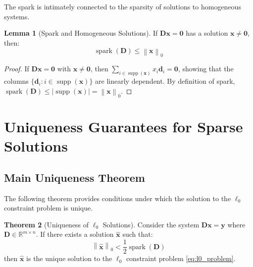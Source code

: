 \documentclass[12pt]{article}
\renewcommand{\vec}[1]{\mathbf{#1}}
\DeclareMathOperator{\spark}{spark}
\DeclareMathOperator{\supp}{supp}
\newcommand{\zeronorm}[1]{\left\|#1\right\|_0}
\newcommand{\Real}{\mathbb{R}}
\theoremstyle{definition}
\newtheorem{theorem}{Theorem}[section]
\newtheorem{lemma}[theorem]{Lemma}
\begin{document}
The spark is intimately connected to the sparsity of solutions to homogeneous systems.

\begin{lemma}[Spark and Homogeneous Solutions]
    \label{lem:spark_homogeneous}
    If $\mathbf{D}\vec{x} = \vec{0}$ has a solution $\vec{x} \neq \vec{0}$, then:
    \begin{equation}
        \spark(\mathbf{D}) \leq \zeronorm{\vec{x}}
    \end{equation}
\end{lemma}

\begin{proof}
    If $\mathbf{D}\vec{x} = \vec{0}$ with $\vec{x} \neq \vec{0}$, then $\sum_{i \in \supp(\vec{x})} x_i \vec{d}_i = \vec{0}$, showing that the columns $\{\vec{d}_i : i \in \supp(\vec{x})\}$ are linearly dependent. By definition of spark, $\spark(\mathbf{D}) \leq |\supp(\vec{x})| = \zeronorm{\vec{x}}$.
\end{proof}

\newpage

\section{Uniqueness Guarantees for Sparse Solutions}

\subsection{Main Uniqueness Theorem}

The following theorem provides conditions under which the solution to the $\ell_0$ constraint problem is unique.

\begin{keytheorem}
    \begin{theorem}[Uniqueness of $\ell_0$ Solutions]
        \label{thm:l0_uniqueness}
        Consider the system $\mathbf{D}\vec{x} = \vec{y}$ where $\mathbf{D} \in \Real^{m \times n}$. If there exists a solution $\hat{\vec{x}}$ such that:
        \begin{equation}
            \zeronorm{\hat{\vec{x}}} < \frac{1}{2}\spark(\mathbf{D})
        \end{equation}
        then $\hat{\vec{x}}$ is the unique solution to the $\ell_0$ constraint problem \eqref{eq:l0_problem}.
    \end{theorem}
\end{keytheorem}
\end{document}
